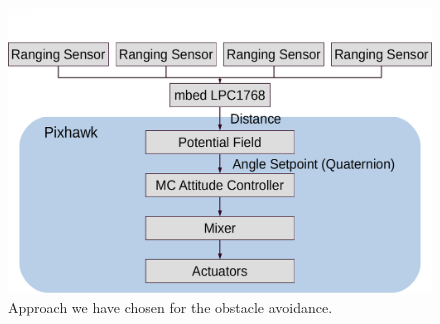 \begin{figure}
	\centering
	\includegraphics[width=0.8\linewidth]{pictures/approach.pdf}
	\caption{Approach we have chosen for the obstacle avoidance.}
	\label{fig:approach}
\end{figure}

